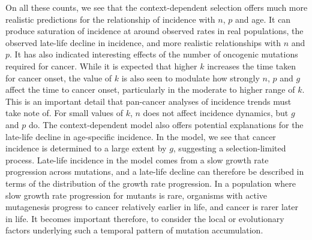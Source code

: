 \documentclass[9pt,twocolumn,twoside]{pnas-new}
\begin{document}
On all these counts, we see that the context-dependent selection offers much more realistic predictions for the relationship of incidence with $n$, $p$ and age. It can produce saturation of incidence at around observed rates in real populations, the observed late-life decline in incidence, and more realistic relationships with $n$ and $p$. It has also indicated interesting effects of the number of oncogenic mutations required for cancer. While it is expected that higher $k$ increases the time taken for cancer onset, the value of $k$ is also seen to modulate how strongly $n$, $p$ and $g$ affect the time to cancer onset, particularly in the moderate to higher range of $k$. This is an important detail that pan-cancer analyses of incidence trends must take note of. For small values of $k$, $n$ does not affect incidence dynamics, but $g$ and $p$ do. The context-dependent model also offers potential explanations for the late-life decline in age-specific incidence. In the model, we see that cancer incidence is determined to a large extent by $g$, suggesting a selection-limited process. Late-life incidence in the model comes from a slow growth rate progression across mutations, and a late-life decline can therefore be described in terms of the distribution of the growth rate progression. In a population where slow growth rate progression for mutants is rare, organisms with active mutagenesis progress to cancer relatively earlier in life, and cancer is rarer later in life. It becomes important therefore, to consider the local or evolutionary factors underlying such a temporal pattern of mutation accumulation. 
\end{document}
